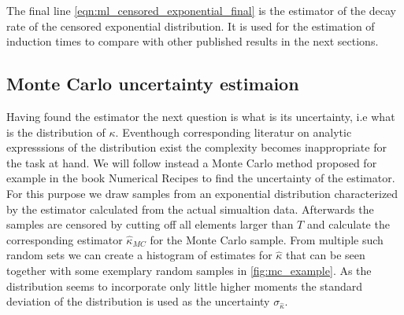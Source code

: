 The final line \autoref{eqn:ml_censored_exponential_final} is the estimator of the decay rate of the censored exponential distribution. It is used for the estimation of induction times to compare with other published results in the next sections.
\subsection{Monte Carlo uncertainty estimaion}
\label{sec:mc_uncertainty}
Having found the estimator the next question is what is its uncertainty, i.e what is the distribution of $\kappa$. Eventhough corresponding literatur on analytic expresssions of the distribution exist the complexity becomes inappropriate for the task at hand. We will follow instead a Monte Carlo method proposed for example in the book Numerical Recipes  to find the uncertainty of the estimator.\\

For this purpose we draw samples from an exponential distribution characterized by the estimator calculated from the actual simualtion data. Afterwards the samples are censored by cutting off all elements larger than $T$ and calculate the corresponding estimator $\hat{\kappa}_{MC}$ for the Monte Carlo sample. From multiple such random sets we can create a histogram of estimates for $\hat{\kappa}$ that can be seen together with some exemplary random samples in \autoref{fig:mc_example}. As the distribution seems to incorporate only little higher moments the standard deviation of the distribution is used as the uncertainty $\sigma_{\hat{\kappa}}$.

